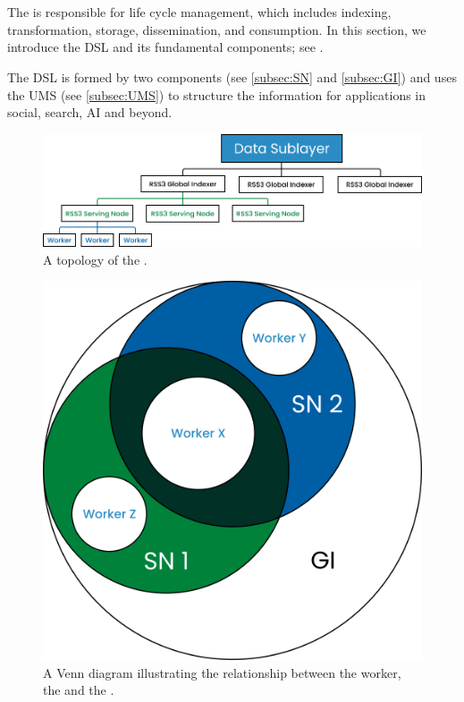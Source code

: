 \section{}
\label{sec:DSL}

The  is responsible for  life cycle management, which includes indexing, transformation, storage, dissemination, and consumption.
In this section, we introduce the \gls{DSL} and its fundamental components; see .

The \gls{DSL} is formed by two components (see \cref{subsec:SN} and \cref{subsec:GI}) and uses the \gls{UMS} (see \cref{subsec:UMS}) to structure the information for applications in social, search, AI and beyond.

    {
        \begin{figure}[tb!]
            \centering
            \includegraphics[width=\columnwidth]{figures/DSL.png}
            \caption{A topology of the .}
            \label{fig:DSL}
        \end{figure}
    }


    {
        \begin{figure}[tb!]
            \centering
            \includegraphics[width=0.7\columnwidth]{figures/GI.png}
            \caption{A Venn diagram illustrating the relationship between the worker, the  and the .}
            \label{fig:GI}
        \end{figure}
    }


